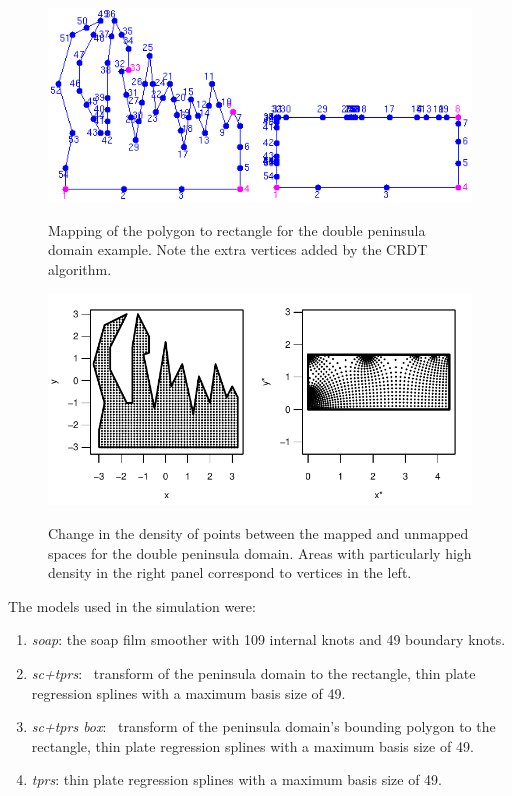 \begin{figure}[t]
\centering
\includegraphics[width=\textwidth]{sc/figs/wigglytop2-numbered.png} \\
\caption{Mapping of the polygon to rectangle for the double peninsula domain example. Note the extra vertices added by the CRDT algorithm.}
\label{wigglytop2-numbered}
\end{figure}

\begin{figure}[t]
\centering
\includegraphics[width=6in]{sc/figs/wt2-points.pdf} \\
\caption{Change in the density of points between the mapped and unmapped spaces for the double peninsula domain. Areas with particularly high density in the right panel correspond to vertices in the left.}
\label{wt2-points}
\end{figure}

The models used in the simulation were:
\begin{enumerate}
\item \textit{soap}: the soap film smoother with 109 internal knots and 49 boundary knots.
\item \textit{sc+tprs}: \sch\ transform of the peninsula domain to the rectangle, thin plate regression splines with a maximum basis size of 49.
\item \textit{sc+tprs box}: \sch\ transform of the peninsula domain's bounding polygon to the rectangle, thin plate regression splines with a maximum basis size of 49.
\item \textit{tprs}: thin plate regression splines with a maximum basis size of 49.
\end{enumerate}

